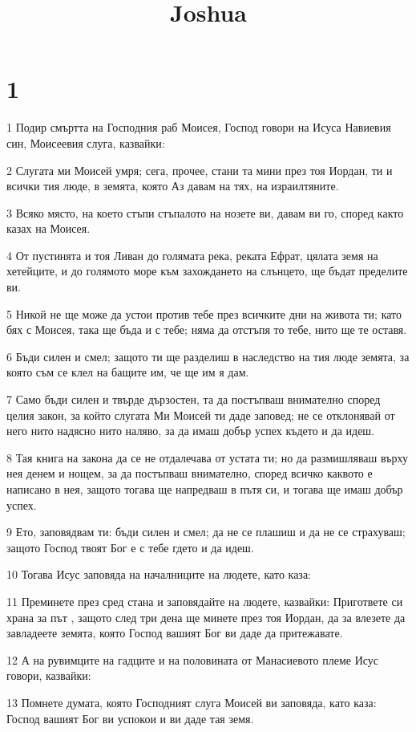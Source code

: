 

\title{Joshua}


\chapter{1}

\par 1 Подир смъртта на Господния раб Моисея, Господ говори на Исуса Навиевия син, Моисеевия слуга, казвайки:
\par 2 Слугата ми Моисей умря; сега, прочее, стани та мини през тоя Иордан, ти и всички тия люде, в земята, която Аз давам на тях, на израилтяните.
\par 3 Всяко място, на което стъпи стъпалото на нозете ви, давам ви го, според както казах на Моисея.
\par 4 От пустинята и тоя Ливан до голямата река, реката Ефрат, цялата земя на хетейците, и до голямото море към захождането на слънцето, ще бъдат пределите ви.
\par 5 Никой не ще може да устои против тебе през всичките дни на живота ти; като бях с Моисея, така ще бъда и с тебе; няма да отстъпя то тебе, нито ще те оставя.
\par 6 Бъди силен и смел; защото ти ще разделиш в наследство на тия люде земята, за която съм се клел на бащите им, че ще им я дам.
\par 7 Само бъди силен и твърде дързостен, та да постъпваш внимателно според целия закон, за който слугата Ми Моисей ти даде заповед; не се отклонявай от него нито надясно нито наляво, за да имаш добър успех където и да идеш.
\par 8 Тая книга на закона да се не отдалечава от устата ти; но да размишляваш върху нея денем и нощем, за да постъпваш внимателно, според всичко каквото е написано в нея, защото тогава ще напредваш в пътя си, и тогава ще имаш добър успех.
\par 9 Ето, заповядвам ти: бъди силен и смел; да не се плашиш и да не се страхуваш; защото Господ твоят Бог е с тебе гдето и да идеш.
\par 10 Тогава Исус заповяда на началниците на людете, като каза:
\par 11 Преминете през сред стана и заповядайте на людете, казвайки: Пригответе си храна за път , защото след три дена ще минете през тоя Иордан, да за влезете да завладеете земята, която Господ вашият Бог ви даде да притежавате.
\par 12 А на рувимците на гадците и на половината от Манасиевото племе Исус говори, казвайки:
\par 13 Помнете думата, която Господният слуга Моисей ви заповяда, като каза: Господ вашият Бог ви успокои и ви даде тая земя.

